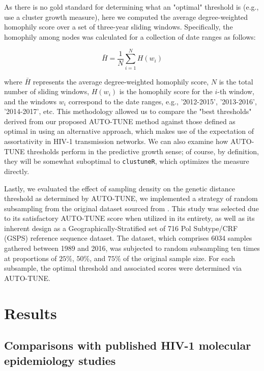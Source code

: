 \documentclass[utf8]{FrontiersinHarvard} %
\begin{document}
As there is no gold standard for determining what an "optimal" threshold is (e.g., \citet{chato_public_2020} use a cluster growth measure),
here we computed the average degree-weighted homophily score over a set of three-year sliding windows. Specifically, the homophily among
nodes was calculated for a collection of date ranges as follows:

\begin{equation} \bar{H} = \frac{1}{N}\sum_{i=1}^{N} H(w_i) \end{equation}

where $\bar{H}$ represents the average degree-weighted homophily score, $N$ is
the total number of sliding windows, $H(w_i)$ is the homophily score for the
$i$-th window, and the windows $w_i$ correspond to the date ranges, e.g.,
'2012-2015', '2013-2016', '2014-2017', etc. This methodology allowed us to
compare the "best thresholds" derived from our proposed AUTO-TUNE method
against those defined as optimal in \citep{chato_public_2020} using an alternative approach, 
which makes use of the expectation of assortativity in HIV-1 transmission networks.
We can also examine how AUTO-TUNE thresholds perform in the predictive growth sense; 
of course, by definition, they will be somewhat suboptimal to {\tt clustuneR}, which optimizes the measure directly.

Lastly, we evaluated the effect of sampling density on the genetic distance
threshold as determined by AUTO-TUNE, we implemented a strategy of random
subsampling from the original dataset sourced from \citep{rhee_national_2019}.
This study was selected due to its satisfactory AUTO-TUNE score when utilized
in its entirety, as well as its inherent design as a Geographically-Stratified
set of 716 Pol Subtype/CRF (GSPS) reference sequence dataset. The dataset,
which comprises 6034 samples gathered between 1989 and 2016, was subjected to
random subsampling ten times at proportions of $25\%$, $50\%$, and $75\%$ of
the original sample size. For each subsample, the optimal threshold and
associated scores were determined via AUTO-TUNE.

\section{Results}

\subsection{Comparisons with published HIV-1 molecular epidemiology studies}
\end{document}
